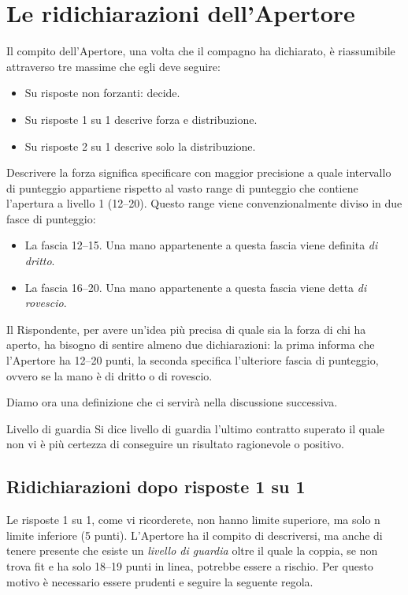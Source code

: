 \documentclass[../corsofiori.tex]{subfiles}
\begin{document}
\chapter{Le ridichiarazioni dell'Apertore}
Il compito dell'Apertore, una volta che il compagno ha dichiarato, è riassumibile attraverso tre massime che egli deve
seguire:
\begin{itemize}
    \item Su risposte non forzanti: decide.
    \item Su risposte 1 su 1 descrive forza e distribuzione.
    \item Su risposte 2 su 1 descrive solo la distribuzione.
\end{itemize}

Descrivere la forza significa specificare con maggior precisione a quale intervallo di punteggio appartiene rispetto al
vasto range di punteggio che contiene l'apertura a livello 1 (12--20).
Questo range viene convenzionalmente diviso in due fasce di punteggio:
\begin{itemize}
    \item La fascia 12--15. Una mano appartenente a questa fascia viene definita \emph{di dritto}.
    \item La fascia 16--20. Una mano appartenente a questa fascia viene detta \emph{di rovescio}.
\end{itemize}

Il Rispondente, per avere un'idea più precisa di quale sia la forza di chi ha aperto, ha bisogno di sentire almeno due
dichiarazioni: la prima informa che l'Apertore ha 12--20 punti, la seconda specifica l'ulteriore fascia di punteggio,
ovvero se la mano è di dritto o di rovescio.

Diamo ora una definizione che ci servirà nella discussione successiva.

\begin{attenzione}{Livello di guardia}
    Si dice livello di guardia l'ultimo contratto superato il quale non vi è più certezza di conseguire un risultato
    ragionevole o positivo.
\end{attenzione}


\section{Ridichiarazioni dopo risposte 1 su 1}
Le risposte 1 su 1, come vi ricorderete, non hanno limite superiore, ma solo n limite inferiore (5 punti). L'Apertore ha
il compito di descriversi, ma anche di tenere presente che esiste un \emph{livello di guardia} oltre il quale la coppia,
se non trova fit e ha solo 18--19 punti in linea, potrebbe essere a rischio. Per questo motivo è necessario essere
prudenti e seguire la seguente regola.
\end{document}
